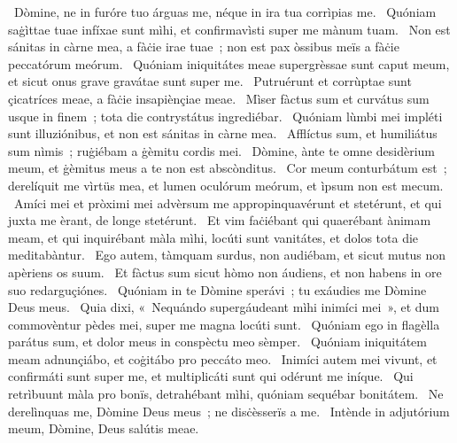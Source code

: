 ~Dòmine, ne in furóre tuo árguas me, néque in ira tua corrìpias me. 
~Quóniam saġìttae tuae infíxae sunt mìhi, et confirmavìsti super me mànum tuam. 
~Non est sánitas in càrne mea, a fàċie irae tuae~; non est pax òssibus meïs a fàċie peccatórum meórum. 
~Quóniam iniquitátes meae supergrèssae sunt caput meum, et sicut onus grave gravátae sunt super me. 
~Putruérunt et corrùptae sunt çicatríces meae, a fàċie insapiènçiae meae. 
~Mìser fàctus sum et curvátus sum usque in finem~; tota die contrystátus ingrediébar. 
~Quóniam lùmbi mei impléti sunt illuziónibus, et non est sánitas in càrne mea. 
~Afflíctus sum, et humiliátus sum nìmis~; ruġiébam a ġèmitu cordis mei. 
~Dòmine, ànte te omne desidèrium meum, et ġèmitus meus a te non est abscònditus. 
~Cor meum conturbátum est~; derelíquit me vìrtüs mea, et lumen oculórum meórum, et ìpsum non est mecum. 
~Amíci mei et pròximi mei advèrsum me appropinquavérunt et stetérunt, et qui juxta me èrant, de longe stetérunt. 
~Et vim faċiébant qui quaerébant ànimam meam, et qui inquirébant màla mìhi, locúti sunt vanitátes, et dolos tota die meditabàntur. 
~Ego autem, tàmquam surdus, non audiébam, et sicut mutus non apèriens os suum. 
~Et fàctus sum sicut hòmo non áudiens, et non habens in ore suo redarguçiónes. 
~Quóniam in te Dòmine sperávi~; tu exáudies me Dòmine Deus meus. 
~Quia dixi, «~Nequándo supergáudeant mìhi inimíci mei~», et dum commovèntur pèdes mei, super me magna locúti sunt. 
~Quóniam ego in flagèlla parátus sum, et dolor meus in conspèctu meo sèmper. 
~Quóniam iniquitátem meam adnunçiábo, et coġitábo pro peccáto meo. 
~Inimíci autem mei vivunt, et confirmáti sunt super me, et multiplicáti sunt qui odérunt me iníque. 
~Qui retrìbuunt màla pro bonïs, detrahébant mìhi, quóniam sequébar bonitátem. 
~Ne derelìnquas me, Dòmine Deus meus~; ne disċèsserïs a me. 
~Intènde in adjutórium meum, Dòmine, Deus salútis meae. 
